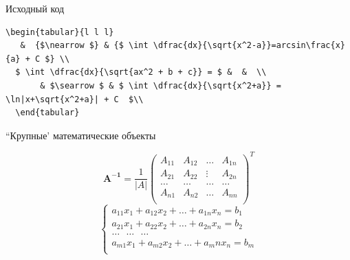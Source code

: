 \documentclass{beamer}[aspectratio=169]
\begin{document}
\begin{frame}[fragile]{Исходный код}
\begin{adjustbox}{scale=0.5}
\begin{large}
\transwipe

 \begin{lstlisting}[language=Tex]
  \begin{tabular}{l l l} 
   &  {$\nearrow $} & {$ \int \dfrac{dx}{\sqrt{x^2-a}}=arcsin\frac{x}{a} + C $} \\
  $ \int \dfrac{dx}{\sqrt{ax^2 + b + c}} = $ &  &  \\ 
       & $\searrow $ & $ \int \dfrac{dx}{\sqrt{x^2+a}} = \ln|x+\sqrt{x^2+a}| + C  $\\ 
  \end{tabular}
\end{lstlisting}
\end{large}
\end{adjustbox}
 

\end{frame}

\begin{frame}{``Крупные' математические объекты}
\transwipe


\begin{displaymath}
\mathbf{A^{-1}}=\dfrac{1}{|A|}
\left( \begin{array}{cccc}
A_{11} & A_{12} & \ldots & A_{1n} \\
A_{21} & A_{22} & \vdots & A_{2n} \\
\ldots & \ldots & \ldots & \ldots \\
A_{n1} & A_{n2} & \ldots & A_{nn} \\
\end{array} \right)^T
\end{displaymath}
\vspace{1cm}
\begin{displaymath}
\left\{ \begin{array}{l}
 a_{11}x_1 + a_{12}x_2 + \ldots + a_{1n}x_n = b_1 \\
 a_{21}x_1 + a_{22}x_2 + \ldots + a_{2n}x_n = b_2 \\
 \ldots \ \ \ \ldots \ \ \  \ldots \\
 a_{m1}x_1 + a_{m2}x_2 + \ldots + a_mn x_n = b_m \\                    
  \end{array} \right.
\end{displaymath}

\end{frame}
\end{document}
